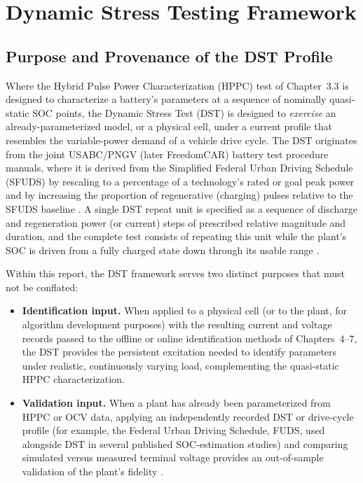 \section{Dynamic Stress Testing Framework}
\label{sec:10_3}

\subsection{Purpose and Provenance of the DST Profile}

Where the Hybrid Pulse Power Characterization (HPPC) test of
Chapter~3.3 is designed to characterize a battery's parameters at a
sequence of nominally quasi-static SOC points, the Dynamic Stress Test
(DST) is designed to \emph{exercise} an already-parameterized model,
or a physical cell, under a current profile that resembles the
variable-power demand of a vehicle drive cycle. The DST originates
from the joint USABC/PNGV (later FreedomCAR) battery test procedure
manuals, where it is derived from the Simplified Federal Urban Driving
Schedule (SFUDS) by rescaling to a percentage of a technology's rated
or goal peak power and by increasing the proportion of regenerative
(charging) pulses relative to the SFUDS baseline
\cite{usabc_manual,freedomcar2003}. A single DST repeat unit is
specified as a sequence of discharge and regeneration power (or
current) steps of prescribed relative magnitude and duration, and the
complete test consists of repeating this unit while the plant's SOC is
driven from a fully charged state down through its usable range
\cite{usabc_manual,idaho_dst_report}.

Within this report, the DST framework serves two distinct purposes
that must not be conflated:

\begin{itemize}
    \item \textbf{Identification input.} When applied to a physical
    cell (or to the plant, for algorithm development purposes) with
    the resulting current and voltage records passed to the offline
    or online identification methods of Chapters~4--7, the DST
    provides the persistent excitation needed to identify parameters
    under realistic, continuously varying load, complementing the
    quasi-static HPPC characterization.
    \item \textbf{Validation input.} When a plant has already been
    parameterized from HPPC or OCV data, applying an independently
    recorded DST or drive-cycle profile (for example, the Federal
    Urban Driving Schedule, FUDS, used alongside DST in several
    published SOC-estimation studies) and comparing simulated versus
    measured terminal voltage provides an out-of-sample validation of
    the plant's fidelity \cite{exogenous_kf_soc,tsmo_soh}.
\end{itemize}

